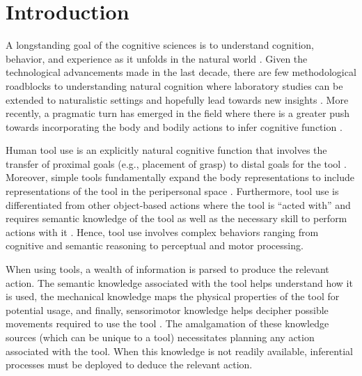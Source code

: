 \section{Introduction}

A longstanding goal of the cognitive sciences is to understand cognition, behavior, and experience as it unfolds in the natural world \citep{Parada2020-qq}. Given the technological advancements made in the last decade, there are few methodological roadblocks to understanding natural cognition where laboratory studies can be extended to naturalistic settings and hopefully lead towards new insights \citep{Ladouce2016-li, Parada2018-vf}. More recently, a pragmatic turn has emerged in the field where there is a greater push towards incorporating the body and bodily actions to infer cognitive function \citep{Engel2013-bx}. 

Human tool use is an explicitly natural cognitive function that involves the transfer of proximal goals (e.g., placement of grasp) to distal goals for the tool \citep{Arbib2009-wa}.  Moreover, simple tools fundamentally expand the body representations to include representations of the tool in the peripersonal space \citep{Berti2000-ap, Farne2005-ns, Maravita2002-sq}. Furthermore, tool use is differentiated from other object-based actions where the tool is “acted with” \citep{Johnson2003-ee} and requires semantic knowledge of the tool as well as the necessary skill to perform actions with it \citep{Johnson-Frey2004-qk}. Hence, tool use involves complex behaviors ranging from cognitive and semantic reasoning to perceptual and motor processing.

When using tools, a wealth of information is parsed to produce the relevant action. The semantic knowledge associated with the tool helps understand how it is used, the mechanical knowledge maps the physical properties of the tool for potential usage, and finally, sensorimotor knowledge helps decipher possible movements required to use the tool \citep{Baumard2014-kv}. The amalgamation of these knowledge sources (which can be unique to a tool) necessitates planning any action associated with the tool. When this knowledge is not readily available, inferential processes must be deployed to deduce the relevant action. 

